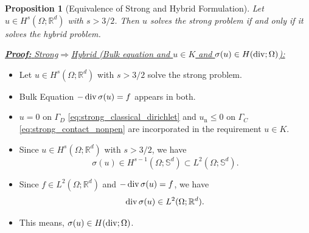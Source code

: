 \documentclass[10pt,aspectratio=169]{beamer}
\newtheorem{proposition}{Proposition}[section]
\def\R{{\mathbb R}}
\def\S{{\mathbb S}}
\newcommand{\diver}{\operatornamewithlimits{div}}
\begin{document}
\begin{frame}
	\begin{proposition}[Equivalence of Strong and Hybrid Formulation]
		Let $u\in H^s(\Omega;\R^d)$ with $s>3/2$. Then $u$ solves the strong problem if and only if it solves the hybrid problem.
	\end{proposition}
	\underline{\textbf{\em Proof:} {\em Strong\enspace}$\Longrightarrow${\em\enspace Hybrid (Bulk equation and $u\in K$ and $\sigma(u)\in H(\diver;\Omega)$):}}
	\begin{itemize}
		\item Let $u\in H^s(\Omega;\R^d)$ with $s>3/2$ solve the strong problem.
		\item Bulk Equation $-\diver \sigma(u) = f$ appears in both.
		\item $u = 0$ on $\Gamma_D$ \eqref{eq:strong_classical_dirichlet} and $u_\mathrm{n}\le 0$ on $\Gamma_C$ \eqref{eq:strong_contact_nonpen} are incorporated in the requirement $u\in K$.
		\item Since $u\in H^s(\Omega;\R^d)$ with $s>3/2$, we have
		      \begin{equation*}
			      \sigma(u)\in H^{s-1}(\Omega;\S^d)\subset L^2(\Omega;\S^d).
		      \end{equation*}
		\item Since $f\in L^2(\Omega;\R^d)$ and $-\diver\sigma(u) = f$, we have
		      \begin{equation*}
			      \diver\sigma(u)\in L^2(\Omega;\R^d).
		      \end{equation*}
		\item This means, $\sigma(u)\in H(\diver;\Omega)$.
	\end{itemize}
\end{frame}
\end{document}
